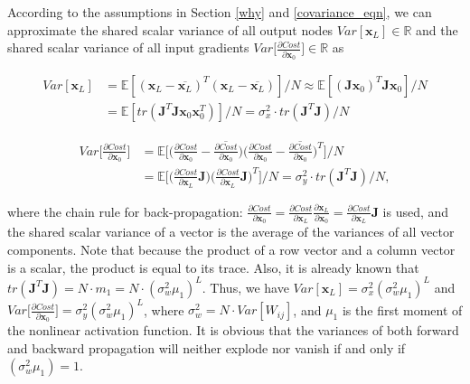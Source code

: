 According to the assumptions in Section \ref{why} and  \eqref{covariance_eqn}, we can approximate the shared scalar variance of all output nodes $Var[\mathbf{x}_L]\in\mathbb{R}$ and the shared scalar variance of all input gradients $Var\Big[\frac{\partial Cost}{\partial \mathbf{x}_0}\Big]\in\mathbb{R}$ as

\begin{equation}
    \begin{aligned}
    Var[\mathbf{x}_L] &=\mathbb{E}[(\mathbf{x}_L-\overline{\mathbf{x}_L})^T(\mathbf{x}_L-\overline{\mathbf{x}_L})]/N
    \approx \mathbb{E}[(\mathbf{Jx}_0)^T\mathbf{Jx}_0]/N\\
    &=\mathbb{E}[tr(\mathbf{J}^T\mathbf{J}\mathbf{x}_0\mathbf{x}_0^T)]/N
    =\sigma_x^2\cdot tr(\mathbf{J}^T\mathbf{J})/N
    \label{xvar_to_trace}
    \end{aligned}
\end{equation}

\begin{equation}
    \begin{aligned}
    Var\Big[\frac{\partial Cost}{\partial \mathbf{x}_0}\Big]
    &=\mathbb{E}\Big[\Big(\frac{\partial Cost}{\partial \mathbf{x}_0}-\overline{\frac{\partial Cost}{\partial \mathbf{x}_0}}\Big)
    \Big(\frac{\partial Cost}{\partial \mathbf{x}_0}-\overline{\frac{\partial Cost}{\partial \mathbf{x}_0}}\Big)^T\Big]\Big/N
    \\
    &= \mathbb{E}\Big[
    \Big(\frac{\partial Cost}{\partial \mathbf{x}_L}\mathbf{J}\Big)
    \Big(\frac{\partial Cost}{\partial \mathbf{x}_L}\mathbf{J}\Big)^T\Big]\Big/N
    =\sigma_y^2\cdot tr(\mathbf{J}^T\mathbf{J})/N,
    \end{aligned}
    \label{yvar_to_trace}
\end{equation}

where the chain rule for back-propagation: $\frac{\partial Cost}{\partial \mathbf{x}_0}=\frac{\partial Cost}{\partial \mathbf{x}_L}\frac{\partial \mathbf{x}_L}{\partial \mathbf{x}_0}=\frac{\partial Cost}{\partial \mathbf{x}_L}\mathbf{J}$ is used, and the shared scalar variance of a vector is the average of the variances of all vector components.
Note that because the product of a row vector and a column vector is a scalar, the product is equal to its trace. Also, it is already known that
$tr(\mathbf{J}^T\mathbf{J})=N\cdot m_1=N\cdot(\sigma_w^2\mu_1)^L$. Thus, we have $Var[\mathbf{x}_L]=\sigma_x^2(\sigma_w^2\mu_1)^L$ and $Var\Big[\frac{\partial Cost}{\partial \mathbf{x}_0}\Big]=\sigma_y^2(\sigma_w^2\mu_1)^L$,
where $\sigma_w^2=N\cdot Var[W_{ij}]$, and $\mu_1$ is the first moment of the nonlinear activation function. It is obvious that the variances of both forward and backward propagation will neither explode nor vanish if and only if $(\sigma_w^2\mu_1)=1$.

